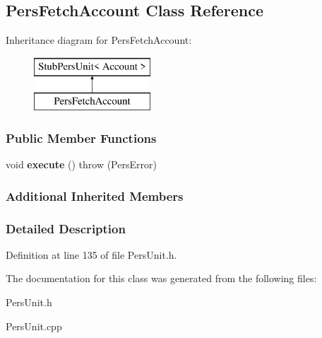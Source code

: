 \hypertarget{classPersFetchAccount}{\subsection{Pers\-Fetch\-Account Class Reference}
\label{df/d2b/classPersFetchAccount}
}
Inheritance diagram for Pers\-Fetch\-Account\-:\begin{figure}[H]
\begin{center}
\leavevmode
\includegraphics[height=2.000000cm]{df/d2b/classPersFetchAccount}
\end{center}
\end{figure}
\subsubsection*{Public Member Functions}
\begin{DoxyCompactItemize}
\item 
\hypertarget{classPersFetchAccount_a8fb6e7e8a65bebe14be61fb1a3c7f471}{void {\bfseries execute} ()  throw (\-Pers\-Error)}\label{df/d2b/classPersFetchAccount_a8fb6e7e8a65bebe14be61fb1a3c7f471}

\end{DoxyCompactItemize}
\subsubsection*{Additional Inherited Members}


\subsubsection{Detailed Description}


Definition at line 135 of file Pers\-Unit.\-h.



The documentation for this class was generated from the following files\-:\begin{DoxyCompactItemize}
\item 
Pers\-Unit.\-h\item 
Pers\-Unit.\-cpp\end{DoxyCompactItemize}
